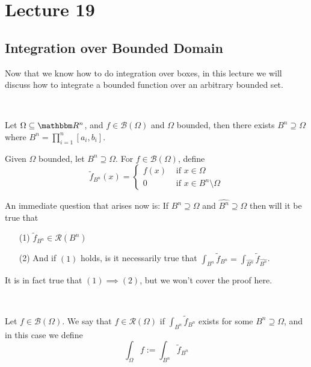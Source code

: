 \documentclass[../Analysis-3.tex]{subfiles}
\begin{document}
\chapter*{Lecture 19} %
\setcounter{chapter}{19} %
\setcounter{section}{0}

\section{Integration over Bounded Domain}

Now that we know how to do integration over boxes, in this lecture we will discuss how to integrate a bounded function over an arbitrary bounded set.

\

Let $\Omega \subseteq \R^n$, and $f \in \mathscr{B}(\Omega)$ and $\Omega$ bounded, then there exists $B^n \supseteq \Omega$ where $B^n = \prod_{i=1}^n [a_i, b_i]$.

\begin{Def}{}{}
  Given $\Omega$ bounded, let $B^n \supseteq \Omega$. For $f \in \mathscr{B}(\Omega)$, define
  \[
    \tilde{f}_{B^n}(x) = \begin{cases}
      f(x) & \mbox{ if } x \in \Omega               \\
      0    & \mbox{ if } x \in B^n \setminus \Omega
    \end{cases}
  \]
\end{Def}

An immediate question that arises now is: If $B^n \supseteq \Omega$ and $\hat{B^n} \supseteq \Omega$ then will it be true that
\begin{enumerate}
  \item[(1)] $\tilde{f}_{B^n} \in \mathscr{R}(B^n)$
  \item[(2)] And if $(1)$ holds, is it necessarily true that $\displaystyle{\int_{B^n} \tilde{f}_{B^n} = \int_{\hat{B^n}} \tilde{f}_{\hat{B^n}}}$.
\end{enumerate}
It is in fact true that $(1) \implies (2)$, but we won't cover the proof here.

\

\begin{Def}{}{}
  Let $f \in \mathscr{B}(\Omega)$. We say that $f \in \mathscr{R}(\Omega)$ if $\int_{B^n} \tilde{f}_{B^n}$ exists for some $B^n \supseteq \Omega$, and in this case we define
  \[
    \int_{\Omega} f := \int_{B^n} \tilde{f}_{B^n}
  \]
\end{Def}
\end{document}

